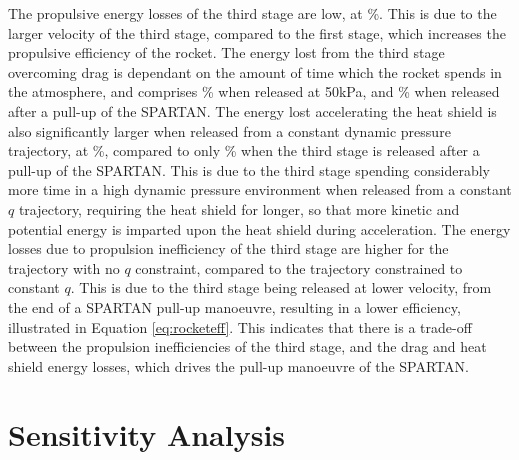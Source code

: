 The propulsive energy losses of the third stage are low, at \PlossthreeCombinedStandardNoReturn \%. This is due to the larger velocity of the third stage, compared to the first stage, which increases the propulsive efficiency of the rocket. 
The energy lost from the third stage overcoming drag is dependant on the amount of time which the rocket spends in the atmosphere, and comprises \WDthreeConstqNoReturn \% when released at 50kPa, and \WDthreeStandardNoReturn \% when released after a pull-up of the SPARTAN.
The energy lost accelerating the heat shield is also significantly larger when released from a constant dynamic pressure trajectory, at \WHSthreeConstqNoReturn \%, compared to only \WHSthreeStandardNoReturn \% when the third stage is released after a pull-up of the SPARTAN. This is due to the third stage spending considerably more time in a high dynamic pressure environment when released from a constant $q$ trajectory, requiring the heat shield for longer, so that more kinetic and potential energy is imparted upon the heat shield during acceleration. The energy losses due to propulsion inefficiency of the third stage are higher for the trajectory with no $q$ constraint, compared to the trajectory constrained to constant $q$. This is due to the third stage being released at lower velocity, from the end of a SPARTAN pull-up manoeuvre, resulting in a lower efficiency, illustrated in Equation \ref{eq:rocketeff}. This indicates that there is a trade-off between the propulsion inefficiencies of the third stage, and the drag and heat shield energy losses, which drives the pull-up manoeuvre of the SPARTAN.  

\section{Sensitivity Analysis}\label{sec:sensitivityNoReturn}


